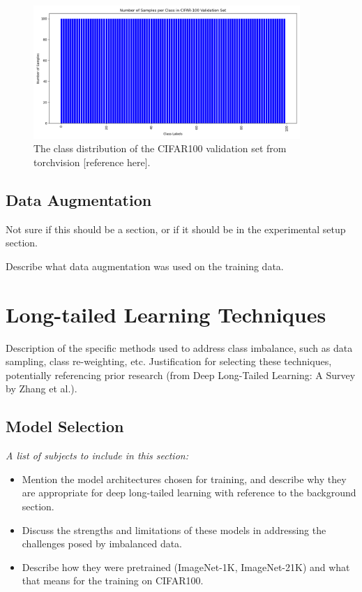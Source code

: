 \begin{figure}[H]
    \centering
    \includegraphics[width=0.9\textwidth]{Images/Plots/cifar100_val_class_distribution.png}
    \caption{The class distribution of the CIFAR100 validation set from torchvision [reference here].}
    \label{fig:cifar100val}
\end{figure}


\subsection{Data Augmentation}
Not sure if this should be a section, or if it should be in the experimental setup section.

Describe what data augmentation was used on the training data.

\section{Long-tailed Learning Techniques}
Description of the specific methods used to address class imbalance, such as data sampling, class re-weighting, etc. 
Justification for selecting these techniques, potentially referencing prior research (from Deep Long-Tailed Learning: A Survey by Zhang et al.).

\subsection{Model Selection}
\textit{A list of subjects to include in this section:}

\begin{itemize}
    \item Mention the model architectures chosen for training, and describe why they are appropriate for deep long-tailed learning with reference to the background section.
    \item Discuss the strengths and limitations of these models in addressing the challenges posed by imbalanced data.
    \item Describe how they were pretrained (ImageNet-1K, ImageNet-21K) and what that means for the training on CIFAR100.
\end{itemize}


